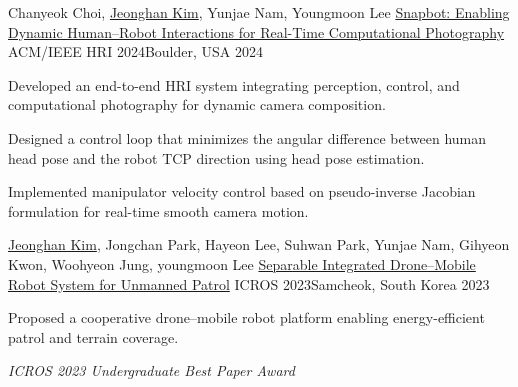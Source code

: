 

\begin{cventries}

  \cvpublication
  {Chanyeok Choi, \underline{Jeonghan Kim}, Yunjae Nam, Youngmoon Lee} %
  {\href{https://dl.acm.org/doi/10.1145/3610978.3640712}{Snapbot: Enabling Dynamic Human–Robot Interactions for Real-Time Computational Photography}} %
  {ACM/IEEE HRI 2024\newline Boulder, USA} %
  {2024} %
  {
    \begin{cvitems}
      \item {Developed an end-to-end HRI system integrating perception, control, and computational photography for dynamic camera composition.}
      \item {Designed a control loop that minimizes the angular difference between human head pose and the robot TCP direction using head pose estimation.}
      \item {Implemented manipulator velocity control based on pseudo-inverse Jacobian formulation for real-time smooth camera motion.}
    \end{cvitems}
  }

  \cvpublication
  {\underline{Jeonghan Kim}, Jongchan Park, Hayeon Lee, Suhwan Park, Yunjae Nam, Gihyeon Kwon, Woohyeon Jung, youngmoon Lee} %
  {\href{https://www.dbpia.co.kr/journal/articleDetail?nodeId=NODE11480514}{Separable Integrated Drone–Mobile Robot System for Unmanned Patrol}} %
  {ICROS 2023\newline Samcheok, South Korea} %
  {2023} %
  {
    \begin{cvitems}
      \item {Proposed a cooperative drone–mobile robot platform enabling energy-efficient patrol and terrain coverage.}
      \item {\textit{ICROS 2023 Undergraduate Best Paper Award}}
    \end{cvitems}
  }
\end{cventries}
